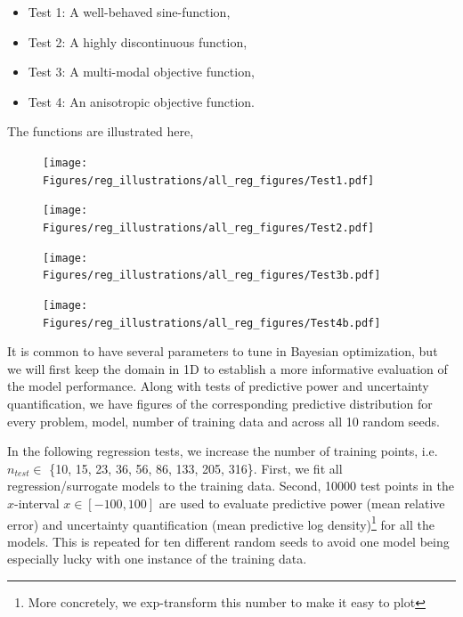 \begin{itemize}
  \item Test 1: A well-behaved sine-function,
  \item Test 2: A highly discontinuous function,
  \item Test 3: A multi-modal objective function,
  \item Test 4: An anisotropic objective function.
\end{itemize}
The functions are illustrated here,

\begin{figure}[h]
  \centering
  \begin{minipage}[b]{0.24\textwidth}
   \texttt{[image: Figures/reg\_illustrations/all\_reg\_figures/Test1.pdf]}
  \end{minipage}
  \hfill
  \begin{minipage}[b]{0.24\textwidth}
    \texttt{[image: Figures/reg\_illustrations/all\_reg\_figures/Test2.pdf]}
   \end{minipage}
   \hfill
   \begin{minipage}[b]{0.24\textwidth}
    \texttt{[image: Figures/reg\_illustrations/all\_reg\_figures/Test3b.pdf]}
   \end{minipage}
   \hfill
   \begin{minipage}[b]{0.24\textwidth}
     \texttt{[image: Figures/reg\_illustrations/all\_reg\_figures/Test4b.pdf]}
    \end{minipage}

  \label{TEST_problems}
\end{figure}

It is common to have several parameters to tune in Bayesian optimization, but we will first keep the
domain in 1D to establish a more informative evaluation of the model performance. Along with tests of predictive power and
uncertainty quantification, we have figures of the corresponding predictive distribution for every problem, 
model, number of training data and across all 10 random seeds. 

In the following regression tests, we increase the number of training points, i.e. $n_{test} \in$
\{10, 15, 23, 36, 56, 86, 133, 205, 316\}. First, we fit all regression/surrogate models to the
training data. Second, 10000 test points in the $x$-interval $x \in [-100,
100]$ are used to evaluate predictive power (mean relative error) and uncertainty quantification
(mean predictive log density)\footnote{More concretely, we exp-transform this number to make it
easy to plot} for all the models. This is repeated for ten different random seeds to avoid one model
being especially lucky with one instance of the training data. 

